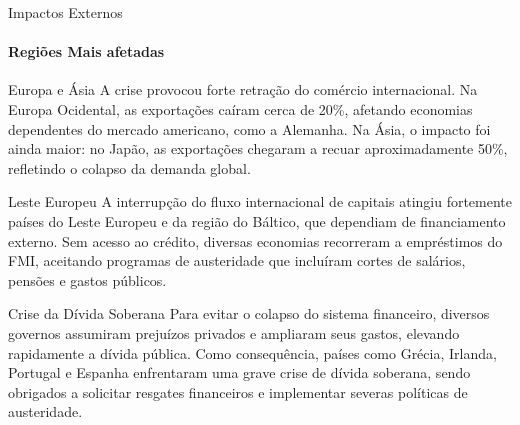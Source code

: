 \documentclass[aspectratio=169, 12pt]{beamer}
\begin{document}
\begin{frame}{Impactos Externos}
  \framesubtitle{Regiões Mais afetadas}
  \begin{block}{Europa e Ásia}
\scriptsize
A crise provocou forte retração do comércio internacional. Na Europa Ocidental, as exportações caíram cerca de 20\%, afetando economias dependentes do mercado americano, como a Alemanha. Na Ásia, o impacto foi ainda maior: no Japão, as exportações chegaram a recuar aproximadamente 50\%, refletindo o colapso da demanda global.
\end{block}
\begin{block}{Leste Europeu}
\scriptsize
A interrupção do fluxo internacional de capitais atingiu fortemente países do Leste Europeu e da região do Báltico, que dependiam de financiamento externo. Sem acesso ao crédito, diversas economias recorreram a empréstimos do FMI, aceitando programas de austeridade que incluíram cortes de salários, pensões e gastos públicos.
\end{block}
\begin{block}{Crise da Dívida Soberana}
\scriptsize
Para evitar o colapso do sistema financeiro, diversos governos assumiram prejuízos privados e ampliaram seus gastos, elevando rapidamente a dívida pública. Como consequência, países como Grécia, Irlanda, Portugal e Espanha enfrentaram uma grave crise de dívida soberana, sendo obrigados a solicitar resgates financeiros e implementar severas políticas de austeridade.
\end{block}
\end{frame}
\end{document}
